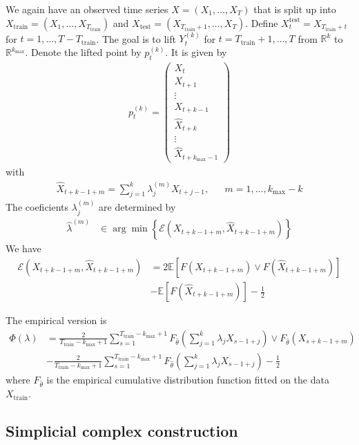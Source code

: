 We again have an observed time series $X=(X_{1},\dots,X_T)$ that is split up into $X_{\text{train}}=(X_1,\dots,X_{T_{\text{train}}})$ and $X_{\text{test}}=(X_{T_{\text{train}}+1},\dots,X_T)$. Define $X^{\text{test}}_t=X_{T_{\text{train}}+t}$ for $t=1,\dots,T-T_{\text{train}}$. The goal is to lift $Y_t^{(k)}$ for $t=T_{\text{train}}+1,\dots,T$ from $\mathbb{R}^k$ to $\mathbb{R}^{k_{\max}}$. Denote the lifted point by $p_t^{(k)}$. It is given by
\begin{align*}
    p_t^{(k)}=\begin{pmatrix}
        X_{t}\\
        X_{t+1}\\
        \vdots\\
        X_{t+k-1}\\
        \hat{X}_{t+k}\\
        \vdots\\
        \hat{X}_{t+k_{\max}-1}
    \end{pmatrix}
\end{align*}
with
\begin{align*}
    \hat{X}_{t+k-1+m}=\sum_{j=1}^{k}\lambda_j^{(m)}X_{t+j-1}, && m=1,\dots,k_{\max}-k
\end{align*}
The coeficients $\lambda_j^{(m)}$ are determined by
\begin{align*}
    \hat{\lambda}^{(m)}&\in\arg\min\left\{\mathcal{E}(X_{t+k-1+m},\hat{X}_{t+k-1+m})\right\}
\end{align*}
We have
\begin{align*}
    \mathcal{E}(X_{t+k-1+m},\hat{X}_{t+k-1+m})&=2\mathbb{E}\left[F(X_{t+k-1+m})\vee F(\hat{X}_{t+k-1+m})\right]\\&
    -\mathbb{E}\left[F(\hat{X}_{t+k-1+m})\right]-\frac{1}{2}
\end{align*}

The empirical version is
\begin{align*}
    \Phi(\lambda)&=\frac{2}{T_{\text{train}}-k_{\max}+1}\sum_{s=1}^{T_{\text{train}}-k_{\max}+1}F_{\hat{\theta}}\left(\sum_{j=1}^{k}\lambda_jX_{s-1+j}\right)\vee F_{\hat{\theta}}\left(X_{s+k-1+m}\right)\\&
    -\frac{2}{T_{\text{train}}-k_{\max}+1}\sum_{s=1}^{T_{\text{train}}-k_{\max}+1}F_{\hat{\theta}}\left(\sum_{j=1}^{k}\lambda_jX_{s-1+j}\right)-\frac{1}{2}
\end{align*}
where $F_{\hat{\theta}}$ is the empirical cumulative distribution function fitted on the data $X_{\text{train}}$.

\subsection*{Simplicial complex construction}

